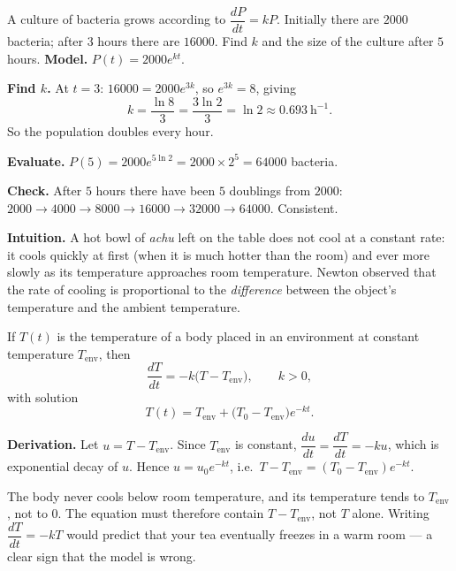 \documentclass[11pt]{article}
\newcounter{popsec}
\newcounter{popsub}
\newcommand{\courssub}[1]{%
  \stepcounter{popsub}%
  \par\vspace{9pt}\noindent{\popxbold\fontsize{11.5}{13}\selectfont\color{popink}{\color{poporange}\thepopsec.\thepopsub}\hspace{6pt}#1}\par\nopagebreak\vspace{4pt}
}
\begin{document}
\begin{exoresolu}
A culture of bacteria grows according to $\dfrac{dP}{dt}=kP$. Initially there are $2000$ bacteria; after $3$ hours there are $16000$. Find $k$ and the size of the culture after $5$ hours.
\tcblower
\textbf{Model.} $P(t)=2000e^{kt}$.

\textbf{Find $k$.} At $t=3$: $16000=2000e^{3k}$, so $e^{3k}=8$, giving
\[
k=\frac{\ln 8}{3}=\frac{3\ln 2}{3}=\ln 2\approx 0.693\ \text{h}^{-1}.
\]
So the population doubles every hour.

\textbf{Evaluate.} $P(5)=2000e^{5\ln 2}=2000\times 2^{5}=64000$ bacteria.

\textbf{Check.} After $5$ hours there have been $5$ doublings from $2000$: $2000\to 4000\to 8000\to 16000\to 32000\to 64000$. Consistent.
\end{exoresolu}

\courssub{Newton's Law of Cooling}

\textbf{Intuition.} A hot bowl of \emph{achu} left on the table does not cool at a constant rate: it cools quickly at first (when it is much hotter than the room) and ever more slowly as its temperature approaches room temperature. Newton observed that the rate of cooling is proportional to the \emph{difference} between the object's temperature and the ambient temperature.

\begin{propriete}
If $T(t)$ is the temperature of a body placed in an environment at constant temperature $T_{\mathrm{env}}$, then
\[
\frac{dT}{dt}=-k\bigl(T-T_{\mathrm{env}}\bigr),\qquad k>0,
\]
with solution
\[
T(t)=T_{\mathrm{env}}+\bigl(T_{0}-T_{\mathrm{env}}\bigr)e^{-kt}.
\]
\end{propriete}

\textbf{Derivation.} Let $u=T-T_{\mathrm{env}}$. Since $T_{\mathrm{env}}$ is constant, $\dfrac{du}{dt}=\dfrac{dT}{dt}=-ku$, which is exponential decay of $u$. Hence $u=u_{0}e^{-kt}$, i.e.\ $T-T_{\mathrm{env}}=(T_{0}-T_{\mathrm{env}})e^{-kt}$.

\begin{attention}
The body never cools below room temperature, and its temperature tends to $T_{\mathrm{env}}$, not to $0$. The equation must therefore contain $T-T_{\mathrm{env}}$, not $T$ alone. Writing $\dfrac{dT}{dt}=-kT$ would predict that your tea eventually freezes in a warm room --- a clear sign that the model is wrong.
\end{attention}
\end{document}
